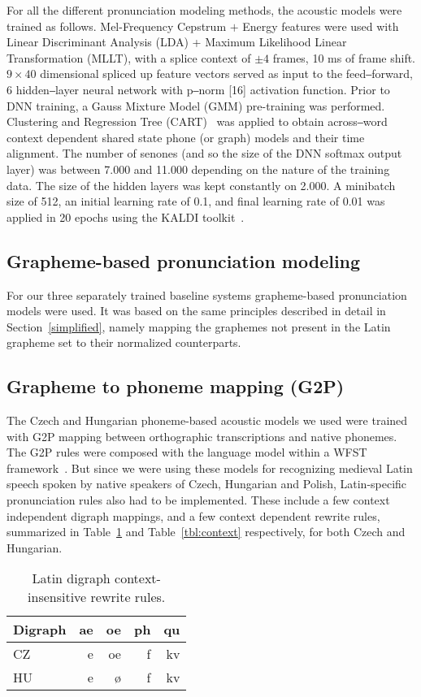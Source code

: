 \documentclass[runningheads,a4paper]{llncs}
\begin{document}
For all the different pronunciation modeling methods, the acoustic models were trained as follows.
Mel-Frequency Cepstrum $+$ Energy features were used with Linear Discriminant Analysis (LDA) + Maximum Likelihood Linear Transformation (MLLT), with a splice context of $\pm4$ frames, 10 ms of frame shift.
$9\times40$ dimensional spliced up feature vectors served as input to the feed‒forward, 6 hidden‒layer neural network with p‒norm [16] activation function.
Prior to DNN training, a Gauss Mixture Model (GMM) pre-training was performed.
Clustering and Regression Tree (CART)~\cite{kaldi} was applied to obtain across‒word context dependent shared state phone (or graph) models and their time alignment.
The number of senones (and so the size of the DNN softmax output layer) was between 7.000 and 11.000 depending on the nature of the training data.
The size of the hidden layers was kept constantly on 2.000.
A minibatch size of 512, an initial learning rate of 0.1, and final learning rate of 0.01 was applied in 20 epochs using the KALDI toolkit~\cite{kaldi}.
\subsection{Grapheme-based pronunciation modeling}\label{grapheme}
For our three separately trained baseline systems grapheme-based pronunciation models were used.
It was based on the same principles described in detail in Section~\ref{simplified}, namely mapping the graphemes not present in the Latin grapheme set to their normalized counterparts.
\subsection{Grapheme to phoneme mapping (G2P)}\label{g2p}
The Czech and Hungarian phoneme-based acoustic models we used were trained with G2P mapping between orthographic transcriptions and native phonemes.
The G2P rules were composed with the language model within a WFST framework~\cite{wfst}.
But since we were using these models for recognizing medieval Latin speech spoken by native speakers of Czech, Hungarian and Polish, Latin-specific pronunciation rules also had to be implemented. 
These include a few context independent digraph mappings, and a few context dependent rewrite rules, summarized in Table~\ref{tbl:digraph} and Table~\ref{tbl:context} respectively, for both Czech and Hungarian.

\begin{table}\label{tbl:digraph}
	\centering
	\caption{Latin digraph context-insensitive rewrite rules.}
	\begin{tabular}{l|rrrr}
	\hline
	Digraph & ae & oe & ph & qu \\
	\hline
	CZ & e & oe & f & kv \\
	HU & e & \o & f & kv \\
	\hline
	\end{tabular}
\end{table}
\end{document}
